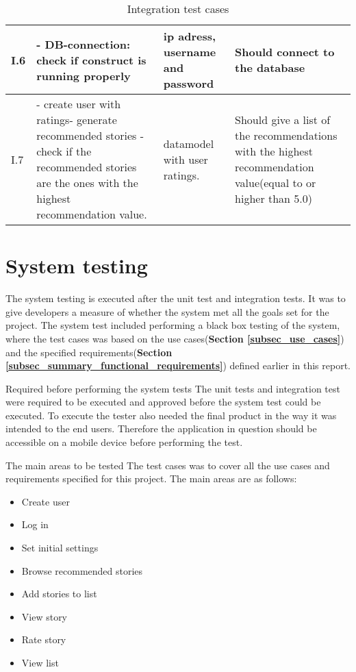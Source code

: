 \begin{table}[!h]
\begin{tabular}{ | p{1cm} | p{6.5cm} | p{3cm} | p{6.5cm} |}
			I.6 & - DB-connection: check if construct is running properly & ip adress, username and password & Should connect to the database \\ \hline
			
			I.7 & - create user with ratings\newline - generate recommended stories \newline - check if the recommended stories are the ones with the highest recommendation value. & datamodel with user ratings. & Should give a list of the recommendations with the highest recommendation value(equal to or higher than 5.0)  \\ \hline
		\end{tabular}
	\caption{Integration test cases}
	\label{Tab_integrationtestcases}
\end{table}

\section{System testing}

The system testing is executed after the unit test and integration tests. It was to give developers a measure of whether the system met all the goals set for the project.  The system test included performing a black box testing of the system, where the test cases was based on the use cases(\textbf{Section \ref{subsec_use_cases}}) and the specified requirements(\textbf{Section \ref{subsec_summary_functional_requirements}})  defined earlier in this report. \newline

Required before performing the system tests\newline
The unit tests and integration test were required to be executed and approved before the system test could be executed. To execute the tester also needed the final product in the way it was intended to the end users. Therefore the application in question should be accessible on a mobile device before performing the test. \newline

The main areas to be tested\newline
The test cases was to cover all the use cases and requirements specified for this project. The main areas are as follows:
\begin{itemize}
	\item Create user
	\item Log in
	\item Set initial settings
	\item Browse recommended stories
	\item Add stories to list
	\item View story
	\item Rate story 
	\item View list \newline
\end{itemize}

